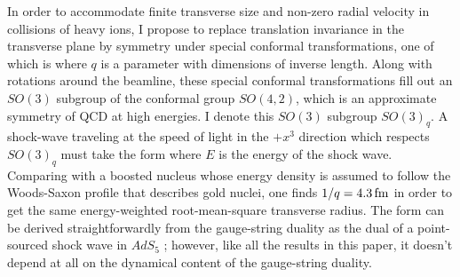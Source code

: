 \documentclass[12pt]{article}
\begin{document}
In order to accommodate finite transverse size and non-zero radial velocity in collisions of heavy ions, I propose to replace translation invariance in the transverse plane by symmetry under special conformal transformations, one of which is
where $q$ is a parameter with dimensions of inverse length.  Along with rotations around the beamline, these special conformal transformations fill out an $SO(3)$ subgroup of the conformal group $SO(4,2)$, which is an approximate symmetry of QCD at high energies.  I denote this $SO(3)$ subgroup $SO(3)_q$.  A shock-wave traveling at the speed of light in the $+x^3$ direction which respects $SO(3)_q$ must take the form
where $E$ is the energy of the shock wave.  Comparing with a boosted nucleus whose energy density is assumed to follow the Woods-Saxon profile that describes gold nuclei, one finds $1/q = 4.3\,{\rm fm}$ in order to get the same energy-weighted root-mean-square transverse radius.  The form  can be derived straightforwardly from the gauge-string duality as the dual of a point-sourced shock wave in $AdS_5$ \cite{Gubser:2008pc}; however, like all the results in this paper, it doesn't depend at all on the dynamical content of the gauge-string duality.
\end{document}
